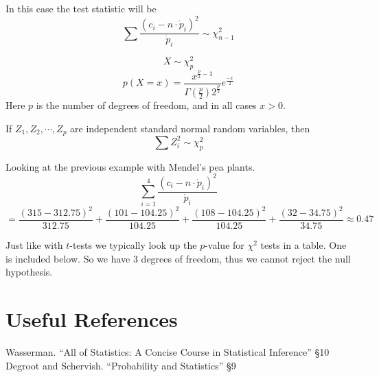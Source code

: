 In this case the test statistic will be 
\[\sum\frac{\left(c_i - n\cdot \dot{p}_i\right)^2}{ \dot{p}_i}\sim\chi^2_{n-1}\]

\begin{aside}
\[X\sim\chi^2_{p}\]
\[p(X=x) = \frac{x^{\frac{p}{2}-1}}{\Gamma\left(\frac{p}{2}\right)2^{\frac{p}{2}}}e^{\frac{-x}{2}}\]
Here $p$ is the number of degrees of freedom, and in all cases $x>0$.


 \begin{center}
\end{center}
\vspace{1em}

If $Z_1,Z_2,\cdots,Z_p$ are independent standard normal random variables,
then
\[\sum Z_i^2 \sim \chi^2_p\]
\end{aside}

Looking at the previous example with Mendel's pea plants. 
\[
\sum_{i=1}^{4}\frac{\left(c_i - n\cdot \dot{p}_i\right)^2}{ \dot{p}_i}\]\[
= \frac{(315-312.75)^2}{312.75} + 
\frac{(101-104.25)^2}{104.25} + 
\frac{(108-104.25)^2}{104.25} + 
\frac{(32-34.75)^2}{34.75}
\approx0.47\]

Just like with $t$-tests we typically look up the $p$-value for $\chi^2$ tests in a table. 
One is included below. 
So we have 3 degrees of freedom, 
thus we cannot reject the null hypothesis. 

\section*{Useful References}
Wasserman. ``All of Statistics: A Concise Course in Statistical Inference'' \S10\\
Degroot and Schervish. ``Probability and Statistics''  \S9
\clearpage 

